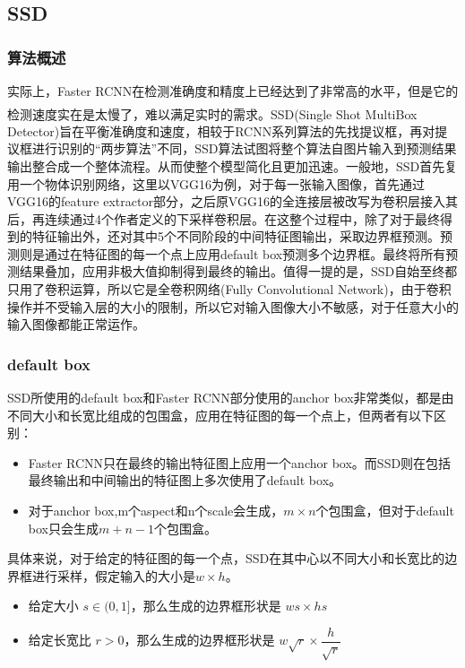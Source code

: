 \documentclass[12pt,a4paper,titlepage]{article}
\newcommand{\upcite}[1]{\textsuperscript{\textsuperscript{\cite{#1}}}}  %
\begin{document}
\subsection{SSD}
\subsubsection{算法概述}
实际上，Faster RCNN在检测准确度和精度上已经达到了非常高的水平，但是它的检测速度实在是太慢了，难以满足实时的需求。SSD\upcite{liu2016ssd}(Single Shot MultiBox Detector)旨在平衡准确度和速度，相较于RCNN系列算法的先找提议框，再对提议框进行识别的“两步算法”不同，SSD算法试图将整个算法自图片输入到预测结果输出整合成一个整体流程。从而使整个模型简化且更加迅速。一般地，SSD首先复用一个物体识别网络，这里以VGG16为例，对于每一张输入图像，首先通过VGG16的feature extractor部分，之后原VGG16的全连接层被改写为卷积层接入其后，再连续通过4个作者定义的下采样卷积层。在这整个过程中，除了对于最终得到的特征输出外，还对其中5个不同阶段的中间特征图输出，采取边界框预测。预测则是通过在特征图的每一个点上应用default box预测多个边界框。最终将所有预测结果叠加，应用非极大值抑制得到最终的输出。值得一提的是，SSD自始至终都只用了卷积运算，所以它是全卷积网络(Fully Convolutional Network)，由于卷积操作并不受输入层的大小的限制，所以它对输入图像大小不敏感，对于任意大小的输入图像都能正常运作。
\subsubsection{default box}
SSD所使用的default box和Faster RCNN部分使用的anchor box非常类似，都是由不同大小和长宽比组成的包围盒，应用在特征图的每一个点上，但两者有以下区别：
\begin{itemize}
\item Faster RCNN只在最终的输出特征图上应用一个anchor box。而SSD则在包括最终输出和中间输出的特征图上多次使用了default box。
\item 对于anchor box,m个aspect和n个scale会生成，$m\times n$个包围盒，但对于default box只会生成$m+n-1$个包围盒。
\end{itemize}

具体来说，对于给定的特征图的每一个点，SSD在其中心以不同大小和长宽比的边界框进行采样，假定输入的大小是$w \times h$。
\begin{itemize}
\item 给定大小 $s\in (0,1]$，那么生成的边界框形状是 $ws \times hs$
\item 给定长宽比 $r > 0$，那么生成的边界框形状是 $w\sqrt{r} \times \dfrac{h}{\sqrt{r}}$
\end {itemize}
\end{document}
